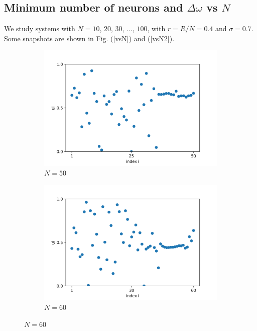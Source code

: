 \documentclass[a4paper,12pt]{article}
\begin{document}
\subsection{Minimum number of neurons and $\Delta \omega$ vs $N$}
We study systems with $N=10$, $20$, $30$, $\dots$, $100$, with $r=R/N=0.4$ and $\sigma = 0.7$. Some snapshots are shown in Fig. (\ref{vsN}) and (\ref{vsN2}).
\begin{figure}[H]
\begin{subfigure}{.32\textwidth}
  \centering
  \includegraphics[width=1\linewidth]{u_N=50.png}  
  \caption{$N=50$}
\end{subfigure}
\hfill
\begin{subfigure}{.32\textwidth}
  \centering
  \includegraphics[width=1\linewidth]{u_N=60.png}  
  \caption{$N=60$}
\end{subfigure}
\hfill

\end{figure}
\end{document}
